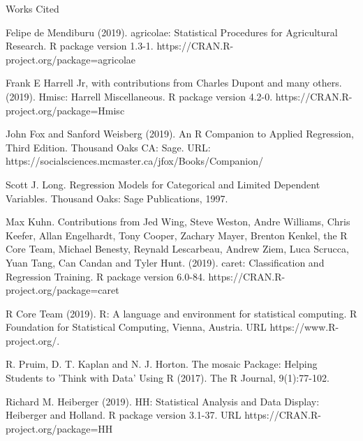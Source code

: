 \documentclass[letter,12pt]{article}
\begin{document}
	\begin{center}
		Works Cited
	\end{center}
	\raggedright
	\begin{hangparas}{.5in}{1}
		Felipe de Mendiburu (2019). agricolae: Statistical Procedures for Agricultural Research. R package version 1.3-1. https://CRAN.R-project.org/package=agricolae
	\end{hangparas}
	\begin{hangparas}{.5in}{1}
	  Frank E Harrell Jr, with contributions from Charles Dupont and many others. (2019). Hmisc: Harrell Miscellaneous. R package version 4.2-0. https://CRAN.R-project.org/package=Hmisc
	\end{hangparas}
	\begin{hangparas}{.5in}{1}
		John Fox and Sanford Weisberg (2019). An {R} Companion to Applied Regression, Third Edition. Thousand Oaks CA: Sage. URL: https://socialsciences.mcmaster.ca/jfox/Books/Companion/
	\end{hangparas}
	\begin{hangparas}{.5in}{1}
	  Scott J. Long. Regression Models for Categorical and Limited Dependent Variables. Thousand Oaks: Sage Publications, 1997.
	\end{hangparas}
	\begin{hangparas}{.5in}{1}
	  Max Kuhn. Contributions from Jed Wing, Steve Weston, Andre Williams, Chris Keefer, Allan Engelhardt, Tony Cooper, Zachary Mayer, Brenton Kenkel, the R Core Team, Michael Benesty, Reynald Lescarbeau, Andrew Ziem, Luca Scrucca, Yuan Tang, Can Candan and Tyler Hunt. (2019). caret: Classification and Regression Training. R package version 6.0-84. https://CRAN.R-project.org/package=caret
	\end{hangparas}
	\begin{hangparas}{.5in}{1}
		R Core Team (2019). R: A language and environment for statistical computing. R Foundation for Statistical Computing, Vienna, Austria. URL https://www.R-project.org/.
	\end{hangparas}
	\begin{hangparas}{.5in}{1}
		R. Pruim, D. T. Kaplan and N. J. Horton. The mosaic Package: Helping Students to 'Think with Data' Using R (2017). The R Journal, 9(1):77-102.
	\end{hangparas}
	\begin{hangparas}{.5in}{1}
	  Richard M. Heiberger (2019). HH: Statistical Analysis and Data Display: Heiberger and Holland. R package version 3.1-37. URL https://CRAN.R-project.org/package=HH
	\end{hangparas}
\end{document}
